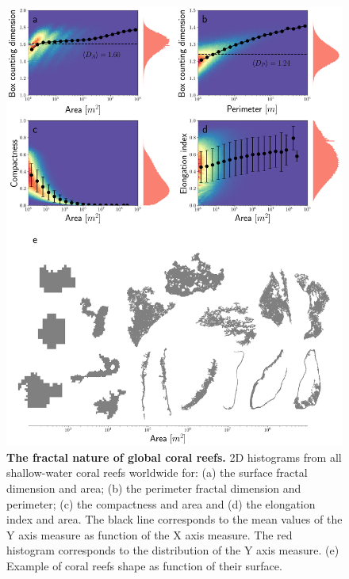 \begin{figure}[H]
    \centering

    \includegraphics[width=1\textwidth]{Figures/individual_reef_analysis_complete.pdf}
    \caption{\textbf{The fractal nature of global coral reefs.} 2D
        histograms from all shallow-water coral reefs worldwide for: (a) the
        surface
        fractal dimension and area; (b) the perimeter fractal dimension and
        perimeter;
        (c) the compactness and area and (d) the elongation index and area. The
        black
        line corresponds to the mean values of the Y axis measure as function
        of the X
        axis measure. The red histogram corresponds to the distribution of the
        Y axis
        measure. (e) Example of coral reefs shape as function of their
        surface.}
    \label{fig:individual_reef_analysis}
\end{figure}

